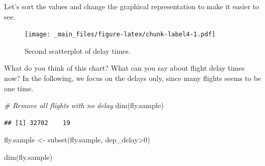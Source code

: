 \documentclass[
]{book}
\newenvironment{Shaded}{\begin{snugshade}}{\end{snugshade}}
\newcommand{\AttributeTok}[1]{\textcolor[rgb]{0.77,0.63,0.00}{#1}}
\newcommand{\CommentTok}[1]{\textcolor[rgb]{0.56,0.35,0.01}{\textit{#1}}}
\newcommand{\DecValTok}[1]{\textcolor[rgb]{0.00,0.00,0.81}{#1}}
\newcommand{\FunctionTok}[1]{\textcolor[rgb]{0.00,0.00,0.00}{#1}}
\newcommand{\NormalTok}[1]{#1}
\newcommand{\OtherTok}[1]{\textcolor[rgb]{0.56,0.35,0.01}{#1}}
\newcommand{\SpecialCharTok}[1]{\textcolor[rgb]{0.00,0.00,0.00}{#1}}
\newcommand{\StringTok}[1]{\textcolor[rgb]{0.31,0.60,0.02}{#1}}
\begin{document}
Let's sort the values and change the graphical representation to make it easier to see.

\begin{Shaded}
\end{Shaded}

\begin{figure}
\centering
\texttt{[image: \_main\_files/figure-latex/chunk-label4-1.pdf]}
\caption{\label{fig:chunk-label4}Second scatterplot of delay times.}
\end{figure}

What do you think of this chart? What can you say about flight delay times now? In the following, we focus on the delays only, since many flights seems to be one time.

\begin{Shaded}
\begin{Highlighting}[]
\CommentTok{\# Remove all flights with no delay}
\FunctionTok{dim}\NormalTok{(fly.sample)}
\end{Highlighting}
\end{Shaded}

\begin{verbatim}
## [1] 32702    19
\end{verbatim}

\begin{Shaded}
\begin{Highlighting}[]
\NormalTok{fly.sample }\OtherTok{\textless{}{-}} \FunctionTok{subset}\NormalTok{(fly.sample, dep\_delay}\SpecialCharTok{\textgreater{}}\DecValTok{0}\NormalTok{)}

\FunctionTok{dim}\NormalTok{(fly.sample)}
\end{Highlighting}
\end{Shaded}
\end{document}
